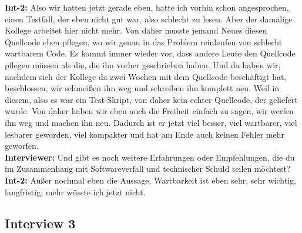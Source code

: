 \textbf{Int-2:} Also wir hatten jetzt gerade eben, hatte ich vorhin schon angesprochen, einen Testfall, der eben nicht gut war, also schlecht zu lesen. Aber der damalige Kollege arbeitet hier nicht mehr. Von daher musste jemand Neues diesen Quellcode eben pflegen, wo wir genau in das Problem reinlaufen von schlecht wartbarem Code. Es kommt immer wieder vor, dass andere Leute den Quellcode pflegen müssen als die, die ihn vorher geschrieben haben. Und da haben wir, nachdem sich der Kollege da zwei Wochen mit dem Quellcode beschäftigt hat, beschlossen, wir schmeißen ihn weg und schreiben ihn komplett neu. Weil in diesem, also es war ein Test-Skript, von daher kein echter Quellcode, der geliefert wurde. Von daher haben wir eben auch die Freiheit einfach zu sagen, wir werfen ihn weg und machen ihn neu. Dadurch ist er jetzt viel besser, viel wartbarer, viel lesbarer geworden, viel kompakter und hat am Ende auch keinen Fehler mehr geworfen. \\
\textbf{Interviewer:} Und gibt es noch weitere Erfahrungen oder Empfehlungen, die du im Zusammenhang mit Softwareverfall und technischer Schuld teilen möchtest? \\
\textbf{Int-2:} Außer nochmal eben die Aussage, Wartbarkeit ist eben sehr, sehr wichtig, langfristig, mehr wüsste ich jetzt nicht. \\

\subsection*{Interview 3}

